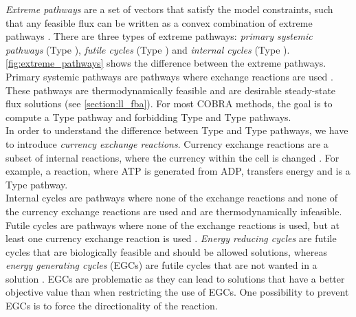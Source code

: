 \textit{Extreme pathways} are a set of vectors that satisfy the model constraints, such that any feasible flux can be written as a convex combination of extreme pathways \cite{price_extreme_2002}.
There are three types of extreme pathways: \textit{primary systemic pathways} (Type ), \textit{futile cycles} (Type ) and \textit{internal cycles} (Type ). \cref{fig:extreme_pathways} shows the difference between the extreme pathways.
Primary systemic pathways are pathways where exchange reactions are used%
\cite{noor_removing_2018}. These pathways are thermodynamically feasible and are desirable steady-state flux solutions (see \cref{section:ll_fba}). 
For most COBRA methods, the goal is to compute a Type  pathway and forbidding Type  and Type  pathways.\\
In order to understand the difference between Type  and Type  pathways, we have to introduce \textit{currency exchange reactions}. Currency exchange reactions are a subset of internal reactions, where the currency within the cell is changed \cite{noor_removing_2018}. For example, a reaction, where ATP is generated from ADP, transfers energy and is a Type  pathway.\\
Internal cycles are pathways where none of the exchange reactions and none of the currency exchange reactions are used and are thermodynamically infeasible. 
Futile cycles are pathways where none of the exchange reactions is used, but at least one currency exchange reaction is used \cite{noor_removing_2018}. \textit{Energy reducing cycles} are futile cycles that are biologically feasible and should be allowed solutions, whereas \textit{energy generating cycles} (EGCs) are futile cycles that are not wanted in a solution \cite{noor_removing_2018}. EGCs are problematic as they can lead to solutions that have a better objective value than when restricting the use of EGCs. One possibility to prevent EGCs is to force the directionality of the reaction. 

